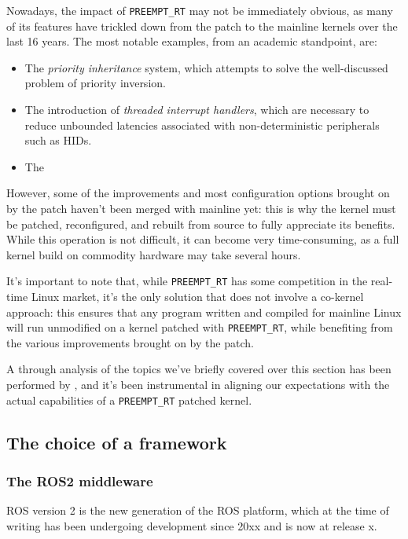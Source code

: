 \documentclass[a4paper,12pt]{report}
\begin{document}
Nowadays, the impact of \texttt{PREEMPT\_RT} may not be immediately obvious, as many of its features have trickled down from the patch to the mainline kernels over the last 16 years. The most notable examples, from an academic standpoint, are:

\begin{itemize}
    \item The \textit{priority inheritance} system, which attempts to solve the well-discussed problem of priority inversion.
    \item The introduction of \textit{threaded interrupt handlers}, which are necessary to reduce unbounded latencies associated with non-deterministic peripherals such as HIDs.
    \item The 
\end{itemize}

However, some of the improvements and most configuration options brought on by the patch haven't been merged with mainline yet: this is why the kernel must be patched, reconfigured, and rebuilt from source to fully appreciate its benefits. While this operation is not difficult, it can become very time-consuming, as a full kernel build on commodity hardware may take several hours.

It's important to note that, while \texttt{PREEMPT\_RT} has some competition in the real-time Linux market, it's the only solution that does not involve a co-kernel approach: this ensures that any program written and compiled for mainline Linux will run unmodified on a kernel patched with \texttt{PREEMPT\_RT}, while benefiting from the various improvements brought on by the patch. 

A through analysis of the topics we've briefly covered over this section has been performed by \textcite{survey-preempt-rt}, and it's been instrumental in aligning our expectations with the actual capabilities of a \texttt{PREEMPT\_RT} patched kernel.

\subsection{The choice of a framework}

\subsubsection{The ROS2 middleware}

ROS version 2 is the new generation of the ROS platform, which at the time of writing has been undergoing development since 20xx and is now at release x.
\end{document}

